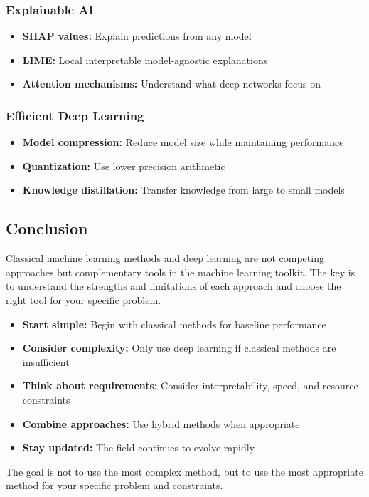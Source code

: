 \subsubsection{Explainable AI}
\begin{itemize}
    \item \textbf{SHAP values:} Explain predictions from any model
    \item \textbf{LIME:} Local interpretable model-agnostic explanations
    \item \textbf{Attention mechanisms:} Understand what deep networks focus on
\end{itemize}

\subsubsection{Efficient Deep Learning}
\begin{itemize}
    \item \textbf{Model compression:} Reduce model size while maintaining performance
    \item \textbf{Quantization:} Use lower precision arithmetic
    \item \textbf{Knowledge distillation:} Transfer knowledge from large to small models
\end{itemize}

\subsection{Conclusion}

Classical machine learning methods and deep learning are not competing approaches but complementary tools in the machine learning toolkit. The key is to understand the strengths and limitations of each approach and choose the right tool for your specific problem.

\begin{itemize}
    \item \textbf{Start simple:} Begin with classical methods for baseline performance
    \item \textbf{Consider complexity:} Only use deep learning if classical methods are insufficient
    \item \textbf{Think about requirements:} Consider interpretability, speed, and resource constraints
    \item \textbf{Combine approaches:} Use hybrid methods when appropriate
    \item \textbf{Stay updated:} The field continues to evolve rapidly
\end{itemize}

The goal is not to use the most complex method, but to use the most appropriate method for your specific problem and constraints.

